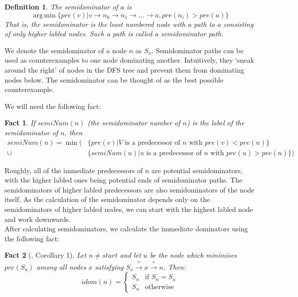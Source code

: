 \documentclass[12pt,a4paper]{article}
\DeclareMathOperator*{\argmin}{arg\,min}
\newtheorem{fact}{Fact}
\newtheorem{definition}{Definition}
\begin{document}
\begin{definition}\label{def:semidominator}
The \emph{semidominator} of $a$ is 
\[
\argmin\{pre(v) | v \to n_0 \to n_1 \to ... \to a, pre(n_i) > pre(a)\}
\]
That is, the semidominator is the least numbered node with a path to $a$
consisting of only higher labled nodes. Such a path is called a \emph{semidominator path}.
\end{definition}
We denote the semidominator of a node $n$ as $S_n$.
Semidominator paths can be used as counterexamples to one node dominating another. Intuitively, they `sneak around the right' of nodes in the DFS tree and prevent them from dominating nodes below. The semidominator can be thought of as the best possible counterexample.

We will need the following fact:
\begin{fact}\label{thm:semidominator}
If $semiNum(n)$ (the \emph{semidominator number} of $n$) is the label of the semidominator of $n$, then
\begin{align*}
semiNum(n) = \min(&\{pre(v) | V \text{ is a predecessor of $n$ with } pre(v) < pre(n)\}\\
\cup &\{semiNum(u) | u \text{ is a predecessor of $n$ with } pre(u) > pre(n)\})
\end{align*}
\end{fact}
Roughly, all of the immediate predecessors of $n$ are potential semidominators, with the higher labled ones being potential ends of semidominator paths. The semidominators of higher labled predecessors are also semidominators of the node itself. As the calculation of the semidominator depends only on the semidominators of higher labled nodes, we can start with the highest labled node and work downwards.\\
After calculating semidominators, we calculate the immediate dominators using the following fact:
\begin{fact}[\cite{lengtarj}, Corollary 1]\label{thm:imdominators}
Let $n \neq start$ and let $u$ be the node which minimises $pre(S_u)$ among all nodes $x$ satisfying $S_x \xrightarrow{+} x \xrightarrow{*} n$. Then:
\[
  idom(n) =
  \begin{cases}
  S_n & \text{if } S_n = S_u\\
  S_u & \text{otherwise}
  \end{cases}
\]
\end{fact}
\end{document}
